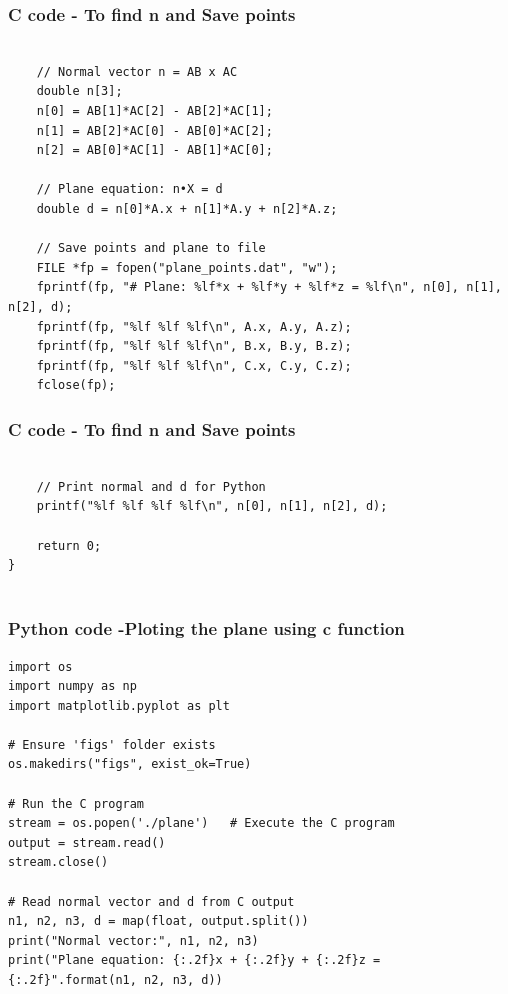 \documentclass{beamer}
\begin{document}
\begin{frame}[fragile]                            
\frametitle{C code - To find n  and Save points}               
\begin{lstlisting}

    // Normal vector n = AB x AC
    double n[3];
    n[0] = AB[1]*AC[2] - AB[2]*AC[1];
    n[1] = AB[2]*AC[0] - AB[0]*AC[2];
    n[2] = AB[0]*AC[1] - AB[1]*AC[0];

    // Plane equation: n•X = d
    double d = n[0]*A.x + n[1]*A.y + n[2]*A.z;

    // Save points and plane to file
    FILE *fp = fopen("plane_points.dat", "w");
    fprintf(fp, "# Plane: %lf*x + %lf*y + %lf*z = %lf\n", n[0], n[1], n[2], d);
    fprintf(fp, "%lf %lf %lf\n", A.x, A.y, A.z);
    fprintf(fp, "%lf %lf %lf\n", B.x, B.y, B.z);
    fprintf(fp, "%lf %lf %lf\n", C.x, C.y, C.z);
    fclose(fp);
\end{lstlisting}
\end{frame}

\begin{frame}[fragile]                            
\frametitle{C code - To find n  and Save points}               
\begin{lstlisting}

    // Print normal and d for Python
    printf("%lf %lf %lf %lf\n", n[0], n[1], n[2], d);

    return 0;
}


\end{lstlisting}
\end{frame}

	
\begin{frame}[fragile]                              
	\frametitle{Python code -Ploting the plane using c function} 
	\begin{lstlisting}
import os
import numpy as np
import matplotlib.pyplot as plt

# Ensure 'figs' folder exists
os.makedirs("figs", exist_ok=True)

# Run the C program
stream = os.popen('./plane')   # Execute the C program
output = stream.read()
stream.close()

# Read normal vector and d from C output
n1, n2, n3, d = map(float, output.split())
print("Normal vector:", n1, n2, n3)
print("Plane equation: {:.2f}x + {:.2f}y + {:.2f}z = {:.2f}".format(n1, n2, n3, d))
\end{lstlisting}
\end{frame}
\end{document}
